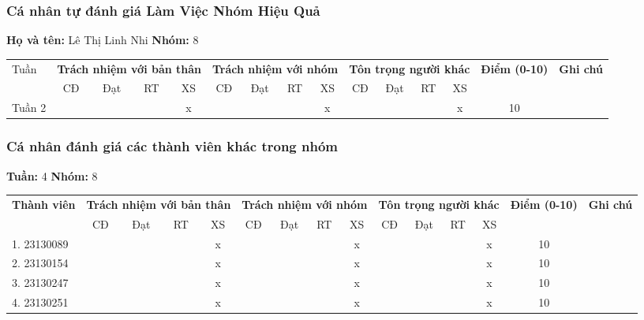 \subsubsection*{Cá nhân tự đánh giá Làm Việc Nhóm Hiệu Quả}

\noindent \textbf{Họ và tên:} Lê Thị Linh Nhi \hrulefill \quad \textbf{Nhóm:} 8 \hrulefill

\vspace{0.5cm}

\begin{tabularx}{\linewidth}{|X|c|c|c|c|c|c|c|c|c|c|c|c|c|c|}
\hline
Tuần & \multicolumn{4}{c|}{\textbf{Trách nhiệm với bản thân}} & \multicolumn{4}{c|}{\textbf{Trách nhiệm với nhóm}} & \multicolumn{4}{c|}{\textbf{Tôn trọng người khác}} & \multirow{2}{1.5cm}{\textbf{Điểm (0-10)}} & \multirow{2}{1.5cm}{\textbf{Ghi chú}} \\ \cline{2-13}
 & CĐ & Đạt & RT & XS & CĐ & Đạt & RT & XS & CĐ & Đạt & RT & XS & & \\ \hline
  Tuần 2 & & & & x & & & & x & & & & x & 10 & \\ \hline
\end{tabularx}

\vspace{1cm}

\subsubsection*{Cá nhân đánh giá các thành viên khác trong nhóm}

\noindent \textbf{Tuần:} 4 \hrulefill \quad \textbf{Nhóm:} 8 \hrulefill

\vspace{0.5cm}

\begin{tabularx}{\linewidth}{|X|c|c|c|c|c|c|c|c|c|c|c|c|c|c|}
\hline
\multirow{2}{3cm}{\textbf{Thành viên}} & \multicolumn{4}{c|}{\textbf{Trách nhiệm với bản thân}} & \multicolumn{4}{c|}{\textbf{Trách nhiệm với nhóm}} & \multicolumn{4}{c|}{\textbf{Tôn trọng người khác}} & \multirow{2}{1.2cm}{\textbf{Điểm (0-10)}} & \multirow{2}{1.5cm}{\textbf{Ghi chú}} \\ \cline{2-13}
 & CĐ & Đạt & RT & XS & CĐ & Đạt & RT & XS & CĐ & Đạt & RT & XS & & \\ \hline
1. 23130089 & & & & x & & & & x & & & & x & 10 & \\ \hline
2. 23130154 & & & & x & & & & x & & & & x & 10 & \\ \hline
3. 23130247 & & & & x & & & & x & & & & x & 10 & \\ \hline
4. 23130251 & & & & x & & & & x & & & & x & 10 & \\ \hline
\end{tabularx}
